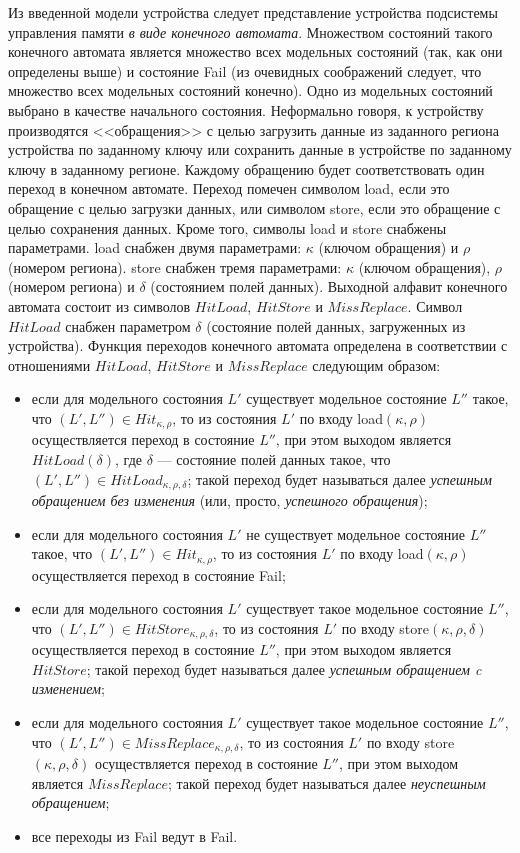 Из введенной модели устройства следует представление устройства подсистемы управления памяти \emph{в виде конечного автомата}. Множеством состояний такого конечного автомата является множество всех модельных состояний (так, как они определены выше) и состояние Fail (из очевидных соображений следует, что множество всех модельных состояний конечно). Одно из модельных состояний выбрано в качестве начального состояния. Неформально говоря, к устройству производятся <<обращения>> с целью загрузить данные из заданного региона устройства по заданному ключу или сохранить данные в устройстве по заданному ключу в заданному регионе. Каждому обращению будет соответствовать один переход в конечном автомате. Переход помечен символом load, если это обращение с целью загрузки данных, или символом store, если это обращение с целью сохранения данных. Кроме того, символы load и store снабжены параметрами. load снабжен двумя параметрами: $\kappa$ (ключом обращения) и $\rho$ (номером региона). store снабжен тремя параметрами: $\kappa$ (ключом обращения), $\rho$ (номером региона) и $\delta$ (состоянием полей данных). Выходной алфавит конечного автомата состоит из символов $HitLoad$, $HitStore$ и $MissReplace$. Символ $HitLoad$ снабжен параметром $\delta$ (состояние полей данных, загруженных из устройства). Функция переходов конечного автомата определена в соответствии с отношениями $HitLoad$, $HitStore$ и $MissReplace$ следующим образом:
  \begin{itemize}
    \item если для модельного состояния $L'$ существует модельное состояние $L''$ такое, что $(L', L'') \in Hit_{\kappa, \rho}$, то из состояния $L'$ по входу load$(\kappa, \rho)$ осуществляется переход в состояние $L''$, при этом выходом является $HitLoad(\delta)$, где $\delta$ --- состояние полей данных такое, что $(L', L'') \in HitLoad_{\kappa, \rho, \delta}$; такой переход будет называться далее \emph{успешным обращением без изменения} (или, просто, \emph{успешного обращения});
    \item если для модельного состояния $L'$ не существует модельное состояние $L''$ такое, что $(L', L'') \in Hit_{\kappa, \rho}$, то из состояния $L'$ по входу load$(\kappa, \rho)$ осуществляется переход в состояние Fail;
    \item если для модельного состояния $L'$ существует такое модельное состояние $L''$, что $(L', L'') \in HitStore_{\kappa, \rho, \delta}$, то из состояния $L'$ по входу store$(\kappa, \rho, \delta)$ осуществляется переход в состояние $L''$, при этом выходом является\\ $HitStore$; такой переход будет называться далее \emph{успешным обращением c изменением};
    \item если для модельного состояния $L'$ существует такое модельное состояние $L''$, что $(L', L'') \in MissReplace_{\kappa, \rho, \delta}$, то из состояния $L'$ по входу store$(\kappa, \rho, \delta)$ осуществляется переход в состояние $L''$, при этом выходом является $MissReplace$; такой переход будет называться далее \emph{неуспешным обращением};
    \item все переходы из Fail ведут в Fail.
  \end{itemize}


